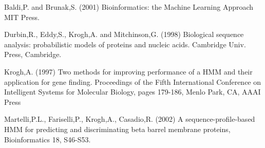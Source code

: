 \documentclass[11pt,english]{article}
\begin{document}
\begin{thebibliography}{100}

 Baldi,P. and Brunak,S. (2001) Bioinformatics: the Machine Learning
Approach MIT Press.

 Durbin,R., Eddy,S., Krogh,A. and Mitchinson,G. (1998) Biological
sequence analysis: probabilistic models of proteins and nucleic
acids. Cambridge Univ. Press, Cambridge.

 Krogh,A. (1997) Two methods for improving performance of a HMM
and their application for gene finding. Proceedings of the Fifth
International Conference on Intelligent Systems for Molecular
Biology, pages 179-186, Menlo Park, CA, AAAI Press

 Martelli,P.L., Fariselli,P., Krogh,A., Casadio,R. (2002)
A sequence-profile-based HMM for predicting and discriminating
beta barrel membrane proteins, Bioinformatics 18, S46-S53.

\end{thebibliography}
\end{document}
